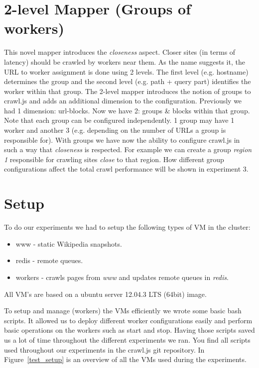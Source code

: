 \section{2-level Mapper (Groups of workers)}
This novel mapper introduces the \emph{closeness} aspect. Closer sites (in terms of latency) should be crawled by workers near them. 
\newline
As the name suggests it, the URL to worker assignment is done using 2 levels. The first level (e.g. hostname) determines the group and the second level (e.g. path + query part) identifies the worker within that group. The 2-level mapper introduces the notion of groups to crawl.js and adds an additional dimension to the configuration. Previously we had 1 dimension: url-blocks. Now we have 2: groups \& blocks within that group. Note that each group can be configured independently. 1 group may have 1 worker and another 3 (e.g. depending on the number of URLs a group is responsible for).
\newline
With groups we have now the ability to configure crawl.js in such a way that \emph{closeness} is respected. For example we can create a group \emph{region 1} responsible for crawling sites \emph{close} to that region. How different group configurations affect the total crawl performance will be shown in experiment 3.

\section{Setup}
To do our experiments we had to setup the following types of VM in the cluster:
\begin{itemize}
\item www - static Wikipedia snapshots.
\item redis - remote queues.
\item workers - crawls pages from \emph{www} and updates remote queues in \emph{redis}.
\end{itemize}
All VM's are based on a ubuntu server 12.04.3 LTS (64bit) image.

To setup and manage (workers) the VMs efficiently we wrote some basic bash scripts. It allowed us to deploy different worker configurations easily and perform basic operations on the workers such as start and stop. Having those scripts saved us a lot of time throughout the different experiments we ran. You find all scripts used throughout our experiments in the crawl.js git repository. In Figure~\ref{test_setup} is an overview of all the VMs used during the experiments.

